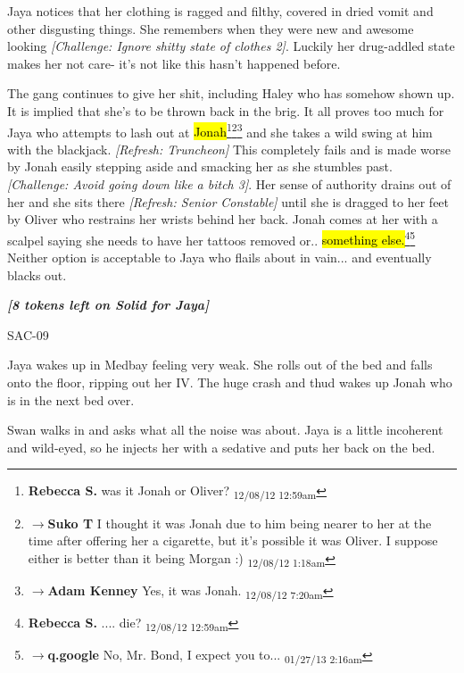 Jaya notices that her clothing is ragged and filthy, covered in dried vomit and other disgusting things.  She remembers when they were new and awesome looking \textit{{[}Challenge: Ignore shitty state of clothes 2{]}}.  Luckily her drug-addled state makes her not care- it's not like this hasn't happened before. 



The gang continues to give her shit, including Haley who has somehow shown up.  It is implied that she's to be thrown back in the brig.  It all proves too much for Jaya who attempts to lash out at \hl{Jonah}\footnote{\textbf{Rebecca S. }was it Jonah or Oliver? \textsubscript{12/08/12 12:59am}}\footnote{$\rightarrow$\textbf{Suko T }I thought it was Jonah due to him being nearer to her at the time after offering her a cigarette, but it's possible it was Oliver.  I suppose either is better than it being Morgan :) \textsubscript{12/08/12 1:18am}}\footnote{$\rightarrow$\textbf{Adam Kenney }Yes, it was Jonah. \textsubscript{12/08/12 7:20am}} and she takes a wild swing at him with the blackjack. \textit{{[}Refresh: Truncheon{]} } This completely fails and is made worse by Jonah easily stepping aside and smacking her as she stumbles past.  \textit{{[}Challenge: Avoid going down like a bitch 3{]}}.  Her sense of authority drains out of her and she sits there \textit{{[}Refresh: Senior Constable{]} }until she is dragged to her feet by Oliver who restrains her wrists behind her back.  Jonah comes at her with a scalpel saying she needs to have her tattoos removed or.. \hl{something else.}\footnote{\textbf{Rebecca S. }.... die? \textsubscript{12/08/12 12:59am}}\footnote{$\rightarrow$\textbf{q.google }No, Mr. Bond, I expect you to... \textsubscript{01/27/13 2:16am}}  Neither option is acceptable to Jaya who flails about in vain... and eventually blacks out.



\textit{\textbf{{[}8 tokens left on Solid for Jaya{]}}}



 {\LARGE SAC-09 } 



Jaya wakes up in Medbay feeling very weak.  She rolls out of the bed and falls onto the floor, ripping out her IV.  The huge crash and thud wakes up Jonah who is in the next bed over.



Swan walks in and asks what all the noise was about. Jaya is a little incoherent and wild-eyed, so he injects her with a sedative and puts her back on the bed.




